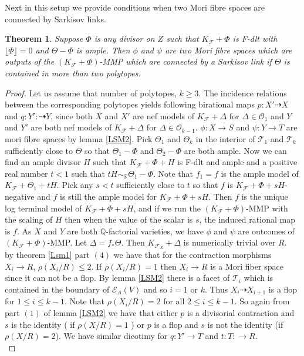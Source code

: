\documentclass[12pt]{amsart}%
\theoremstyle{plain}
\newtheorem{theorem}{Theorem}[section]
\theoremstyle{remark}
\theoremstyle{definition}
\newcommand{\<}{\leq}
\newcommand{\mbQ}{\mathbb{Q}}
\newcommand{\mbR}{\mathbb{R}}
\theoremstyle{definition}
\theoremstyle{definition}
\numberwithin{equation}{section}
\theoremstyle{remark}
\begin{document}
Next in this setup we provide conditions when two Mori fibre spaces are connected by Sarkisov links.
\begin{theorem}
    Suppose $\Phi$ is any divisor on $Z$ such that $K_{\mathcal{F}}+\Phi$ is F-dlt with $\lfloor \Phi\rfloor=0$ and $\Theta-\Phi$ is ample. Then $\phi$ and $\psi$ are two Mori fibre spaces which are outputs of the $(K_{\mathcal{F}}+\Phi)$-MMP which are connected by a Sarkisov link if $\Theta$ is contained in more than two polytopes.
\end{theorem}
\begin{proof}
    Let us assume that number of polytopes, $k\geqslant 3$. The incidence relations between the corresponding polytopes yields following birational maps $p:X'\dashrightarrow X$ and $q:Y':\dashrightarrow Y$, since both $X$ and $X'$ are nef models of $K_{\mathcal{F}}+\Delta$ for $\Delta\in\mathcal{O}_1$ and $Y$ and $Y'$ are both nef models of $K_{\mathcal{F}}+\Delta$ for $\Delta\in \mathcal{O}_{k-1}$. $\phi:X\rightarrow S$ and $\psi:Y\rightarrow T$ are mori fibre spaces by lemma \ref{LSM2}. Pick $\Theta_1$ and $\Theta_k$ in the interior of $\mathcal{T}_1$ and $\mathcal{T}_k$ sufficiently close to $\Theta$ so that $\Theta_1-\Phi$ and $\Theta_2-\Phi$ are both ample.  Now we can find an ample divisor $H$ such that $K_{\mathcal{F}}+\Phi+H$ is F-dlt and ample and a positive real number $t<1$ such that $tH\sim_{\mbR}\Theta_1-\Phi$. Note that $f_1=f$ is the ample model of $K_{\mathcal{F}}+\Theta_1+tH$. Pick any $s<t$ sufficiently close to $t$ so that $f$ is $K_{\mathcal{F}}+\Phi+sH$-negative and $f$ is still the ample model for $K_{\mathcal{F}}+\Phi+sH$. Then $f$ is the unique log terminal model of $K_{\mathcal{F}}+\Phi+sH$, and if we run the $(K_{\mathcal{F}}+\Phi)$-MMP with the scaling of $H$ then when the value of the scalar is $s$, the induced rational map is $f$. As $X$ and $Y$ are both $\mbQ$-factorial varieties, we have $\phi$ and $\psi$ are outcomes of $(K_{\mathcal{F}}+\Phi)$-MMP. Let $\Delta=f_*\Theta$. Then $K_{\mathcal{F}_X}+\Delta$ is numerically trivial over $R$.\\
    by theorem \ref{Lsm1} part $(4)$ we have that for the contraction morphisms $X_i\rightarrow R$, $\rho(X_i/R)\leqslant 2$. If $\rho(X_i/R)=1$ then $X_i\rightarrow R$ is a Mori fiber space since it can not be a flop. By lemma \ref{LSM2} there is a facet of $\mathcal{T}_i$ which is contained in the boundary of $\mathcal{E}_A(V)$ and so $i=1$ or $k$. Thus $X_i\dashrightarrow X_{i+1}$ is a flop for $1\leqslant i\leqslant k-1$. Note that $\rho(X_i/R)=2$ for all $2\leqslant i\leqslant k-1$. So again from part $(1)$ of lemma \ref{LSM2} we have that either $p$ is a divisorial contraction and $s$ is the identity ( if $\rho(X/R)=1$ ) or $p$ is a flop and $s$ is not the identity (if $\rho(X/R)=2$). We have similar dicotimy for $q:Y'\rightarrow T$ and $t:T:\rightarrow R$.\\

\end{proof}
\end{document}

